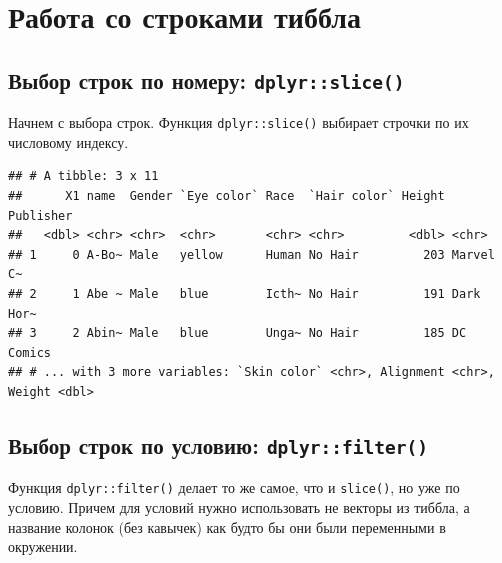 \documentclass[]{book}
\newenvironment{Shaded}{\begin{snugshade}}{\end{snugshade}}
\newcommand{\KeywordTok}[1]{\textcolor[rgb]{0.13,0.29,0.53}{\textbf{#1}}}
\newcommand{\DecValTok}[1]{\textcolor[rgb]{0.00,0.00,0.81}{#1}}
\newcommand{\StringTok}[1]{\textcolor[rgb]{0.31,0.60,0.02}{#1}}
\newcommand{\OperatorTok}[1]{\textcolor[rgb]{0.81,0.36,0.00}{\textbf{#1}}}
\newcommand{\NormalTok}[1]{#1}
\begin{document}
\section{Работа со строками тиббла}\label{tidy_select_rows}

\subsection{\texorpdfstring{Выбор строк по номеру:
\texttt{dplyr::slice()}}{Выбор строк по номеру: dplyr::slice()}}\label{tidy_slice}

Начнем с выбора строк. Функция \texttt{dplyr::slice()} выбирает строчки
по их числовому индексу.

\begin{Shaded}
\end{Shaded}

\begin{verbatim}
## # A tibble: 3 x 11
##      X1 name  Gender `Eye color` Race  `Hair color` Height Publisher
##   <dbl> <chr> <chr>  <chr>       <chr> <chr>         <dbl> <chr>    
## 1     0 A-Bo~ Male   yellow      Human No Hair         203 Marvel C~
## 2     1 Abe ~ Male   blue        Icth~ No Hair         191 Dark Hor~
## 3     2 Abin~ Male   blue        Unga~ No Hair         185 DC Comics
## # ... with 3 more variables: `Skin color` <chr>, Alignment <chr>, Weight <dbl>
\end{verbatim}

\subsection{\texorpdfstring{Выбор строк по условию:
\texttt{dplyr::filter()}}{Выбор строк по условию: dplyr::filter()}}\label{tidy_filter}

Функция \texttt{dplyr::filter()} делает то же самое, что и
\texttt{slice()}, но уже по условию. Причем для условий нужно
использовать не векторы из тиббла, а название колонок (без кавычек) как
будто бы они были переменными в окружении.

\begin{Shaded}
\end{Shaded}
\end{document}
